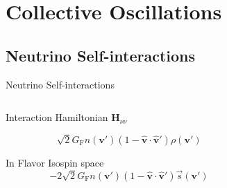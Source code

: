 \section{Collective Oscillations}

\subsection{Neutrino Self-interactions}

\begin{frame}{Neutrino Self-interactions}


\begin{columns}[T]
   \begin{column}{0.5\textwidth}

      Interaction Hamiltonian $\mathbf H_{\nu\nu}$

      \begin{equation*}
         \sqrt{2}G_{\mathrm F} n(\boldsymbol{v}') (1- \hat{\boldsymbol{v}} \cdot \hat{\boldsymbol{v}}') \rho( \boldsymbol{v}' )
      \end{equation*}

      In Flavor Isospin space
      \begin{equation*}
         -2\sqrt{2}G_{\mathrm F} n(\boldsymbol{v}') (1- \hat{ \boldsymbol{v} } \cdot \hat{\boldsymbol{v} }')  \vec s ( \boldsymbol{v}' )
      \end{equation*}




   \end{column}

   \begin{column}{0.5\textwidth}


\end{column}
\end{columns}
\end{frame}
